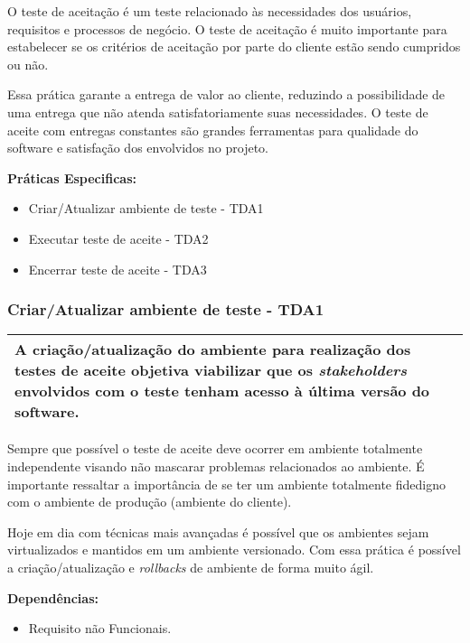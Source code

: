 O teste de aceitação é um teste relacionado às necessidades dos usuários, requisitos e processos de negócio. O teste de aceitação é muito importante para estabelecer se os critérios de aceitação por parte do cliente estão sendo cumpridos ou não.

Essa prática garante a entrega de valor ao cliente, reduzindo a possibilidade de uma entrega que não atenda satisfatoriamente suas necessidades. O teste de aceite com entregas constantes são grandes ferramentas para qualidade do software e satisfação dos envolvidos no projeto.

\textbf{Práticas Especificas:}
\begin{itemize}
    \item  Criar/Atualizar ambiente de teste - TDA1
    \item  Executar teste de aceite - TDA2
    \item  Encerrar teste de aceite - TDA3
\end{itemize}


\subsubsection{Criar/Atualizar ambiente de teste - TDA1}
\label{sec:tda1}

\begin{table}[!ht]
\centering
\begin{tabular}{|p{130mm}|}
\hline
A criação/atualização do ambiente para realização dos testes de aceite objetiva viabilizar que os \textit{stakeholders} envolvidos com o teste tenham acesso à última versão do software. \\ 
\hline
\end{tabular}
\end{table}

Sempre que possível o teste de aceite deve ocorrer em ambiente totalmente independente visando não mascarar problemas relacionados ao ambiente. É importante ressaltar a importância de se ter um ambiente totalmente fidedigno com o ambiente de produção (ambiente do cliente).

Hoje em dia com técnicas mais avançadas é possível que os ambientes sejam virtualizados e mantidos em um ambiente versionado. Com essa prática é possível a criação/atualização e \textit{rollbacks} de ambiente de forma muito ágil.

\textbf{Dependências: }
\begin{itemize}
    \item  Requisito não Funcionais.
\end{itemize}

